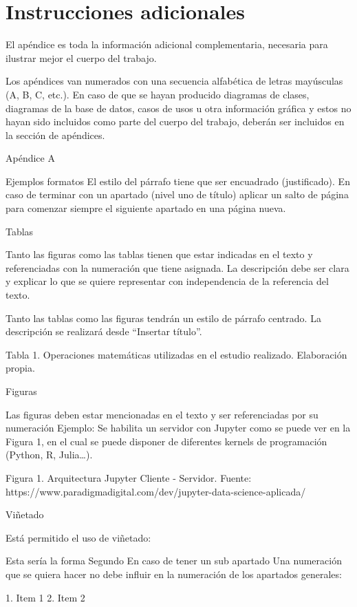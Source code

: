 \chapter{Instrucciones adicionales}\label{ch:appendix_1}


El apéndice es toda la información adicional complementaria, necesaria para ilustrar mejor el cuerpo del trabajo.

Los apéndices van numerados con una secuencia alfabética de letras mayúsculas (A, B, C, etc.). En caso de que se hayan
producido diagramas de clases, diagramas de la base de datos, casos de usos u otra información gráfica y estos no hayan
sido incluidos como parte del cuerpo del trabajo, deberán ser incluidos en la sección de apéndices.

Apéndice A

Ejemplos formatos
El estilo del párrafo tiene que ser encuadrado (justificado).
En caso de terminar con un apartado (nivel uno de título) aplicar un salto de página para comenzar siempre el siguiente
apartado en una página nueva.

Tablas

Tanto las figuras como las tablas tienen que estar indicadas en el texto y referenciadas con la numeración que tiene
asignada.
La descripción debe ser clara y explicar lo que se quiere representar con independencia de la referencia del texto.

Tanto las tablas como las figuras tendrán un estilo de párrafo centrado.
La descripción se realizará desde “Insertar título”.


Tabla 1. Operaciones matemáticas utilizadas en el estudio realizado. Elaboración propia.

Figuras

Las figuras deben estar mencionadas en el texto y ser referenciadas por su numeración Ejemplo: Se habilita un servidor
con Jupyter como se puede ver en la Figura 1, en el cual se puede disponer de diferentes kernels de programación
(Python, R, Julia…).

Figura 1.
Arquitectura Jupyter Cliente - Servidor.
Fuente: https://www.paradigmadigital.com/dev/jupyter-data-science-aplicada/


Viñetado

Está permitido el uso de viñetado:

Esta sería la forma
Segundo
En caso de tener un sub apartado
Una numeración que se quiera hacer no debe influir en la numeración de los apartados generales:

1. Item 1
2. Item 2
